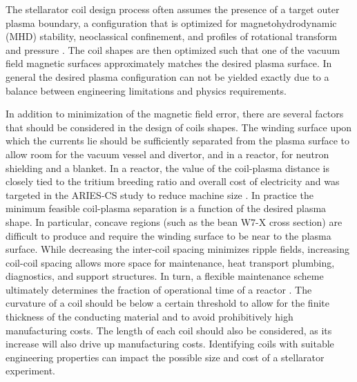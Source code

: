 \documentclass[aps,unsortedaddress]{revtex4-1}
\begin{document}
The stellarator coil design process often assumes the presence of a target outer plasma boundary, a configuration that is optimized for magnetohydrodynamic (MHD) stability, neoclassical confinement, and profiles of rotational transform and pressure \cite{Nuhrenberg1988}. The coil shapes are then optimized such that one of the vacuum field magnetic surfaces approximately matches the desired plasma surface. In general the desired plasma configuration can not be yielded exactly due to a balance between engineering limitations and physics requirements.

In addition to minimization of the magnetic field error, there are several factors that should be considered in the design of coils shapes. The winding surface upon which the currents lie should be sufficiently separated from the plasma surface to allow room for the vacuum vessel and divertor, and in a reactor, for neutron shielding and a blanket.
In a reactor, the value of the coil-plasma distance is closely tied to the tritium breeding ratio and overall cost of electricity and was targeted in the ARIES-CS study to reduce machine size \cite{Guebaly2008}. In practice the minimum feasible coil-plasma separation is a function of the desired plasma shape. In particular, concave regions (such as the bean W7-X cross section) are difficult to produce \cite{Landreman2016} and require the winding surface to be near to the plasma surface. While decreasing the inter-coil spacing minimizes ripple fields, increasing coil-coil spacing allows more space for maintenance, heat transport plumbing, diagnostics, and support structures. In turn, a flexible maintenance scheme ultimately determines the fraction of operational time of a reactor \cite{Waganer2008}. The curvature of a coil should be below a certain threshold to allow for the finite thickness of the conducting material and to avoid prohibitively high manufacturing costs. The length of each coil should also be considered, as its increase will also drive up manufacturing costs. Identifying coils with suitable engineering properties can impact the possible size and cost of a stellarator experiment. 
\end{document}
